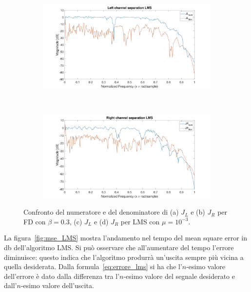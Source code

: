 \documentclass[12pt,a4paper,titlepage]{article}
\begin{document}
\begin{figure}[h]
	\ContinuedFloat
	\centering	
	\begin{subfigure}{1\textwidth}
		\includegraphics[width=1\textwidth]{Immagini/left_channel_separation_LMS}
		\caption{}
		\label{left_channel_separation_LMS}
	\end{subfigure}\\
	\begin{subfigure}{1\textwidth}
		\includegraphics[width=1\textwidth]{Immagini/right_channel_separation_LMS}
		\caption{}
		\label{right_channel_separation_LMS}
	\end{subfigure}
	\caption{Confronto del numeratore e del denominatore di (a) $J_L$ e (b) $J_R$ per FD con $\beta = 0.3$, (c) $J_L$ e (d) $J_R$ per LMS con $\mu = 10^{-3}$.}
	\label{fig:channel_separation_LMS_FD}
\end{figure}

La figura~\ref{fig:mse_LMS} mostra l'andamento nel tempo del mean square error in \si{\decibel} dell'algoritmo LMS. Si può osservare che all'aumentare del tempo l'errore diminuisce: questo indica che l'algoritmo produrrà un'uscita sempre più vicina a quella desiderata. Dalla formula~\eqref{eq:errore_lms} si ha che l'$n$-esimo valore dell'errore è dato dalla differenza tra l'$n$-esimo valore del segnale desiderato e dall'$n$-esimo valore dell'uscita.
\end{document}
